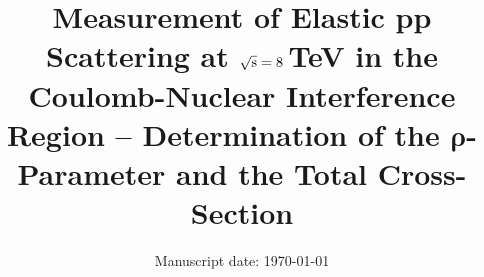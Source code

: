 \documentclass[pdftex,twocolumn,epjc3]{svjour3}
\begin{document}
\title{Measurement of Elastic pp Scattering at $\sqrt{\hbox{s}} = \hbox{8}$\,TeV in the Coulomb-Nuclear Interference Region -- Determination of the $\mathbf{\rho}$-Parameter and the Total Cross-Section}





\date{Manuscript date: \today}

\maketitle


\begin{abstract}

\end{abstract}
















\begin{acknowledgements}

\end{acknowledgements}


\begin{thebibliography}{99}

\end{thebibliography}
\end{document}
